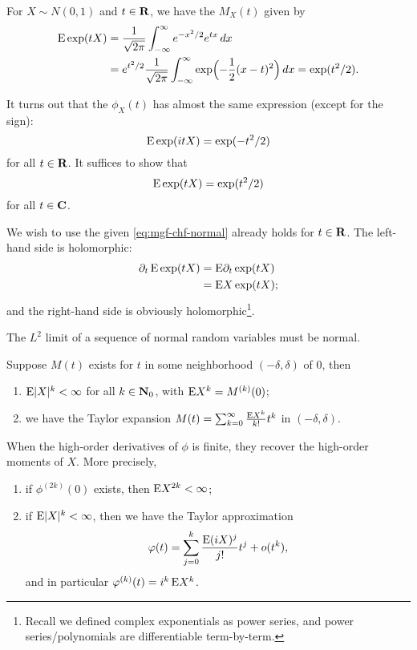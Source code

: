 \begin{exa}
    For $X \sim N(0,1)$ and $t\in \mathbf{R}$, we have the $M_X(t)$ given by \begin{align*}
        \mathop{}\!\mathrm{E} \exp(tX) & = \frac{1}{\sqrt{2\pi}}\int_{-\infty}^\infty e^{-x^2/2} e^{tx} \,dx \\
        & = e^{t^2/2} \frac{1}{\sqrt{2\pi}} \int_{-\infty}^\infty \exp\Bigl(-\frac{1}{2}(x-t)^2\Bigr)\,dx = \exp(t^2/2).
    \end{align*}

    It turns out that the $\phi_X(t)$ has almost the same expression (except for the sign): \[
        \mathop{}\!\mathrm{E} \exp(itX) = \exp(-t^2/2)
    \] for all $t\in \mathbf{R}$. It suffices to show that \begin{equation}
        \E \exp(tX) = \exp(t^2/2) \label{eq:mgf-chf-normal}
    \end{equation} for all $t\in \mathbf{C}$.
    
    We wish to use the  given \eqref{eq:mgf-chf-normal} already holds for $t\in \mathbf{R}$. The left-hand side is holomorphic: \begin{align*}
        \partial_t \mathop{}\!\mathrm{E}\exp(tX) & = \mathop{}\!\mathrm{E}\partial_t \exp(tX) \\
        & = \mathop{}\!\mathrm{E} X\exp(tX);
    \end{align*} and the right-hand side is obviously holomorphic\footnote{Recall we defined complex exponentials as power series, and power series/polynomials are differentiable term-by-term.}.
\end{exa}

\begin{exa}
    The $L^2$ limit of a sequence of normal random variables must be normal.
\end{exa}

\begin{namedthm}
    Suppose $M(t)$ exists for $t$ in some neighborhood $(-\delta,\delta)$ of $0$, then \begin{enumerate}
        \item $\mathop{}\!\mathrm{E} \lvert X \rvert^k < \infty$ for all $k\in \mathbf{N}_0$, with $\mathop{}\!\mathrm{E} X^k = M^{(k)}(0)$;
        \item we have the Taylor expansion $M(t) = \sum_{k=0}^\infty \frac{\mathop{}\!\mathrm{E} X^k}{k!} t^k$ in $(-\delta,\delta)$.
    \end{enumerate}
\end{namedthm}

\begin{namedthm} \leavevmode
When the high-order derivatives of $\phi$ is finite, they recover the high-order moments of $X$. More precisely, 
    \begin{enumerate}
        \item if $\phi^{(2k)}(0)$ exists, then $\mathop{}\!\mathrm{E} X^{2k} < \infty$;
        \item if $\mathop{}\!\mathrm{E} \lvert X \rvert^k <\infty$, then we have the Taylor approximation \[
            \varphi(t) = \sum_{j=0}^k\frac{\mathop{}\!\mathrm{E} (iX)^j}{j!} t^j + o(t^k),
        \] and in particular $\varphi^{(k)}(t) = i^k \mathop{}\!\mathrm{E} X^k$.
    \end{enumerate}
\end{namedthm}

